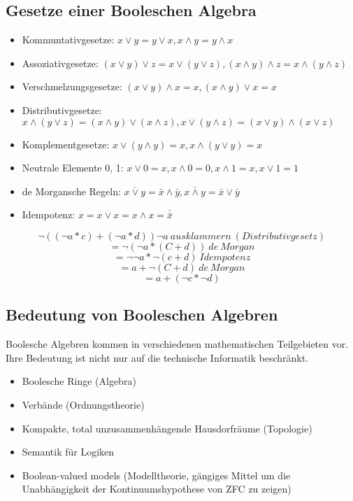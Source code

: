 \documentclass[../main.tex]{subfiles}
\begin{document}
\subsection{Gesetze einer Booleschen Algebra}
\begin{itemize}
\item Kommuntativgesetze: $x \lor y = y \lor x, x \land y = y \land x$
\item Assoziativgesetze: $(x \lor y) \lor z = x \lor (y \lor z),
(x \land y) \land z = x \land (y \land z)$
\item Verschmelzungsgesetze: $(x \lor y) \land x = x,(x \land y) \lor x = x$
\item Distributivgesetze: $x \land (y \lor z)=(x \land y) \lor (x \land z),
x \lor (y \land z)=(x \lor y) \land (x \lor z)$
\item Komplementgesetze: $x \lor (y \land y) = x, x \land (y \lor y) = x$
\item Neutrale Elemente 0, 1: $x \lor 0 = x, x \land 0=0, x \land 1 = x, x \lor 1=1$
\item de Morgansche Regeln: $\overline{x \lor y} = \bar{x} \land \bar{y}, \overline{x \land y} = \bar{x} \lor \bar{y}$
\item Idempotenz: $x = x \lor x = x \land x = \bar{\bar{x}}$
\end{itemize}
\begin{example}
\[¬((¬a*c)+(¬a*d)) ¬a\ ausklammern\ (Distributivgesetz)\]
\[=¬(¬a*(C+d))\ de\ Morgan \]
\[=¬¬a * ¬(c+d)\ Idempotenz \]
\[=a + ¬(C+d)\ de\ Morgan \]
\[=a+(¬c*¬d) \]
\end{example}
\subsection{Bedeutung von Booleschen Algebren}
Boolesche Algebren kommen in verschiedenen mathematischen
Teilgebieten vor. Ihre Bedeutung ist nicht nur auf die technische
Informatik beschränkt.
\begin{examples}
\begin{itemize}
    \item Boolesche Ringe (Algebra)
    \item Verbände (Ordnungstheorie)
    \item Kompakte, total unzusammenhängende Hausdorfräume (Topologie)
    \item Semantik für Logiken
    \item Boolean-valued models (Modelltheorie, gängiges Mittel um die Unabhängigkeit der Kontinuumshypothese von ZFC zu zeigen)
\end{itemize}
\end{examples}
\end{document}
